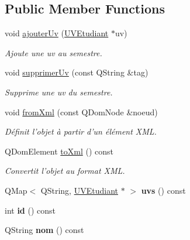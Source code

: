 \subsection*{Public Member Functions}
\begin{DoxyCompactItemize}
\item 
void \hyperlink{classSemestre_a4315bab4b2425a4000da60d3afb811e2}{ajouter\+Uv} (\hyperlink{classUVEtudiant}{U\+V\+Etudiant} $\ast$uv)
\begin{DoxyCompactList}\small\item\em Ajoute une uv au semestre. \end{DoxyCompactList}\item 
void \hyperlink{classSemestre_abb29a3e06f99052e28356a671c200c91}{supprimer\+Uv} (const Q\+String \&tag)
\begin{DoxyCompactList}\small\item\em Supprime une uv du semestre. \end{DoxyCompactList}\item 
\hypertarget{classSemestre_a9f63fd844fd580c26b7df6f3786bc59b}{void \hyperlink{classSemestre_a9f63fd844fd580c26b7df6f3786bc59b}{from\+Xml} (const Q\+Dom\+Node \&noeud)}\label{classSemestre_a9f63fd844fd580c26b7df6f3786bc59b}

\begin{DoxyCompactList}\small\item\em Définit l'objet à partir d'un élément X\+M\+L. \end{DoxyCompactList}\item 
Q\+Dom\+Element \hyperlink{classSemestre_a36272015189e8641d0a736f99981b876}{to\+Xml} () const 
\begin{DoxyCompactList}\small\item\em Convertit l'objet au format X\+M\+L. \end{DoxyCompactList}\item 
\hypertarget{classSemestre_adae6581e8bc96ed833939ba6d9ac62d8}{Q\+Map$<$ Q\+String, \hyperlink{classUVEtudiant}{U\+V\+Etudiant} $\ast$ $>$ {\bfseries uvs} () const }\label{classSemestre_adae6581e8bc96ed833939ba6d9ac62d8}

\item 
\hypertarget{classSemestre_ae829aa152161807619e874b98327f896}{int {\bfseries id} () const }\label{classSemestre_ae829aa152161807619e874b98327f896}

\item 
\hypertarget{classSemestre_aec76232f9da3b2e52947a403d426a8f2}{Q\+String {\bfseries nom} () const }\label{classSemestre_aec76232f9da3b2e52947a403d426a8f2}


\end{DoxyCompactItemize}
